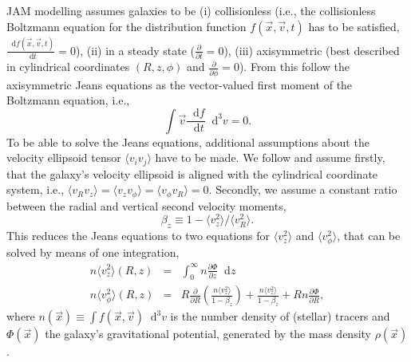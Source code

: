 \documentclass[useAMS,usenatbib]{mnras}
\newcommand*\diff{\mathop{}\!\mathrm{d}}
\newcommand*\Diff[1]{\mathop{}\!\mathrm{d^#1}}
\newcommand{\vect}[1]{\vec{#1}} %
\begin{document}
JAM modelling assumes galaxies to be (i) collisionless (i.e., the collisionless Boltzmann equation for the distribution function $f(\vect{x},\vect{v},t)$ has to be satisfied, $\frac{\diff f(\vect{x},\vect{v},t)}{\diff t} = 0$), (ii) in a steady state ($\frac{\partial}{\partial t} = 0$), (iii) axisymmetric (best described in cylindrical coordinates $(R,z,\phi)$ and $\frac{\partial}{\partial \phi} = 0$). From this follow the axisymmetric Jeans equations as the vector-valued first moment of the Boltzmann equation, i.e.,
\begin{equation*}
\int \vect{v} \frac{\diff f}{\diff t} \Diff3 v = 0.
\end{equation*}
To be able to solve the Jeans equations, additional assumptions about the velocity ellipsoid tensor $\langle v_i v_j\rangle$ have to be made. We follow \citet{Cap08} and assume firstly, that the galaxy's velocity ellipsoid is aligned with the cylindrical coordinate system, i.e., $\langle v_R v_z\rangle = \langle v_z v_\phi \rangle = \langle v_\phi v_R \rangle = 0$. Secondly, we assume a constant ratio between the radial and vertical second velocity moments, 
\begin{equation}
\beta_z \equiv 1 - \langle v_z^2 \rangle / \langle v_R^2\rangle. \label{eq:bz}
\end{equation}
This reduces the Jeans equations to two equations for $\langle v_z^2 \rangle$ and $\langle v_\phi^2 \rangle$, that can be solved by means of one integration,
\begin{eqnarray}
n \langle v_z^2 \rangle (R,z) &=& \int_0^\infty n \frac{\partial \Phi}{\partial z} \diff z \label{eq:Jeans1}\\
n \langle v_\phi^2 \rangle (R,z) &=& R \frac{\partial}{\partial R} \left( \frac{n \langle v_z^2 \rangle}{1-\beta_z} \right) + \frac{n \langle v_z^2 \rangle}{1 - \beta_z} + R n \frac{\partial \Phi}{\partial R},\label{eq:Jeans2}
\end{eqnarray}
where $n(\vect{x}) \equiv \int f(\vect{x},\vect{v}) \Diff3 v$ is the number density of (stellar) tracers and $\Phi(\vect{x})$ the galaxy's gravitational potential, generated by the mass density $\rho(\vect{x})$.
\end{document}
